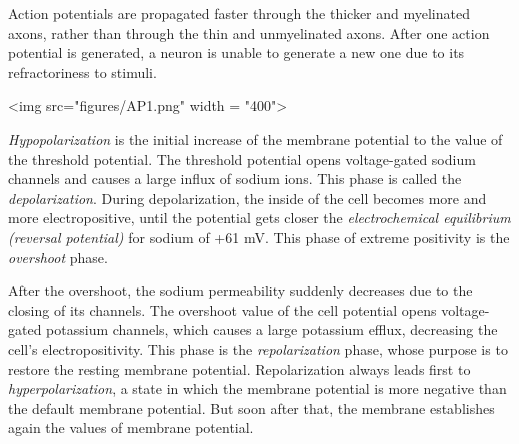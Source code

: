 Action potentials are propagated faster through the thicker and myelinated axons, rather than through the thin and unmyelinated axons. After one action potential is generated, a neuron is unable to generate a new one due to its refractoriness to stimuli.

<img src="figures/AP1.png" width = "400">


\textit{Hypopolarization} is the initial increase of the membrane potential to the value of the threshold potential. The threshold potential opens voltage-gated sodium channels and causes a large influx of sodium ions. This phase is called the \textit{depolarization}. During depolarization, the inside of the cell becomes more and more electropositive, until the potential gets closer the \textit{electrochemical equilibrium (reversal potential)} for sodium of +61 mV. This phase of extreme positivity is the \textit{overshoot} phase.

After the overshoot, the sodium permeability suddenly decreases due to the closing of its channels. The overshoot value of the cell potential opens voltage-gated potassium channels, which causes a large potassium efflux, decreasing the cell’s electropositivity. This phase is the \textit{repolarization} phase, whose purpose is to restore the resting membrane potential. Repolarization always leads first to \textit{hyperpolarization}, a state in which the membrane potential is more negative than the default membrane potential. But soon after that, the membrane establishes again the values of membrane potential.